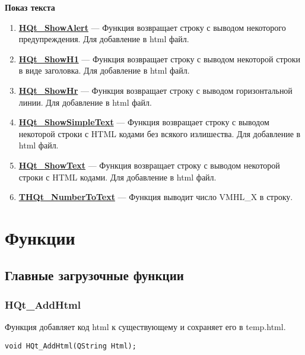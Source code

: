 \documentclass[a4paper,12pt]{article}
\begin{document}
\textbf{Показ текста}
\begin{enumerate}

\item \textbf{\hyperref[HQt_ShowAlert]{HQt\_ShowAlert}} --- Функция возвращает строку с выводом некоторого предупреждения. Для добавление в html файл.

\item \textbf{\hyperref[HQt_ShowH1]{HQt\_ShowH1}} --- Функция возвращает строку с выводом некоторой строки в виде заголовка. Для добавление в html файл.

\item \textbf{\hyperref[HQt_ShowHr]{HQt\_ShowHr}} --- Функция возвращает строку с выводом горизонтальной линии. Для добавление в html файл.

\item \textbf{\hyperref[HQt_ShowSimpleText]{HQt\_ShowSimpleText}} --- Функция возвращает строку с выводом некоторой строки с HTML кодами без всякого излишества. Для добавление в html файл.

\item \textbf{\hyperref[HQt_ShowText]{HQt\_ShowText}} --- Функция возвращает строку с выводом некоторой строки с HTML кодами. Для добавление в html файл.

\item \textbf{\hyperref[THQt_NumberToText]{THQt\_NumberToText}} --- Функция выводит число VMHL\_X в строку.

\end{enumerate}


\newpage
\section{Функции}
\subsection{Главные загрузочные функции}

\subsubsection{HQt\_AddHtml}\label{HQt_AddHtml}

Функция добавляет код html к существующему и сохраняет его в temp.html.


\begin{lstlisting}[label=code_syntax_HQt_AddHtml,caption=Синтаксис]
void HQt_AddHtml(QString Html);
\end{lstlisting}
\end{document}
